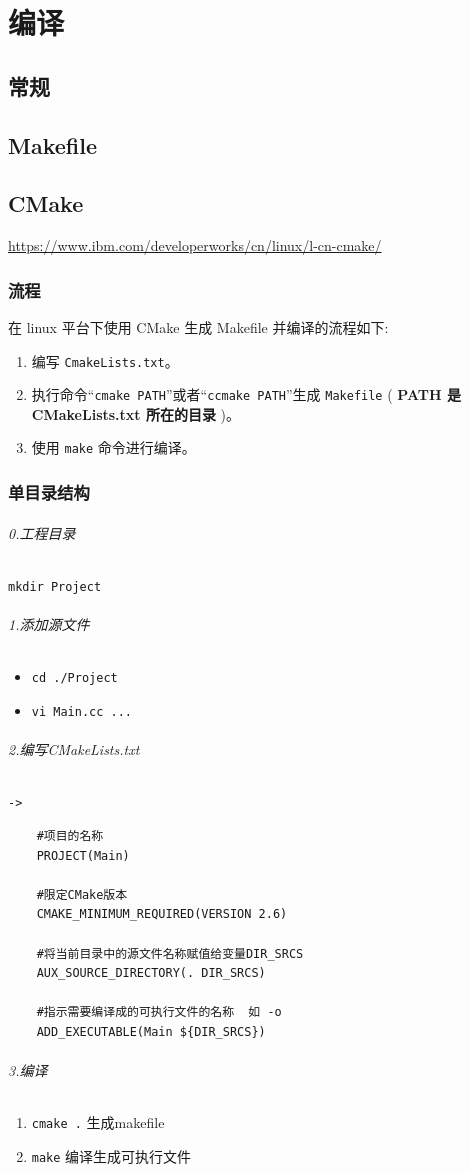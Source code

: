 \documentclass[UTF8,a4paper,12pt]{ctexbook}
\begin{document}
\chapter{编译}
	\section{常规}
	
	\section{Makefile}
	
	
	\section{CMake}	
		\url{https://www.ibm.com/developerworks/cn/linux/l-cn-cmake/}
		\subsection{流程}
			在 linux 平台下使用 CMake 生成 Makefile 并编译的流程如下:
			
			\begin{enumerate}
				\item 编写 \verb|CmakeLists.txt|。
				\item 执行命令“\verb|cmake PATH|”或者“\verb|ccmake PATH|”生成 \verb|Makefile| ( \textbf{PATH 是 CMakeLists.txt 所在的目录} )。
				\item 使用 \verb|make| 命令进行编译。
			\end{enumerate}
			
		\subsection{单目录结构}
			\subparagraph{0.工程目录}
				\verb|mkdir Project|
			\subparagraph{1.添加源文件}
				\begin{itemize}[itemindent = 2em]
					\item \verb|cd ./Project|
					\item \verb|vi Main.cc ...|
				\end{itemize}
				
			\subparagraph{2.编写CMakeLists.txt}\verb|-> |
				\begin{lstlisting}
	#项目的名称
	PROJECT(Main)
	
	#限定CMake版本
	CMAKE_MINIMUM_REQUIRED(VERSION 2.6)
	
	#将当前目录中的源文件名称赋值给变量DIR_SRCS
	AUX_SOURCE_DIRECTORY(. DIR_SRCS)
	
	#指示需要编译成的可执行文件的名称  如 -o
	ADD_EXECUTABLE(Main ${DIR_SRCS})
				\end{lstlisting}
			\subparagraph{3.编译}
				\begin{enumerate}[itemindent = 2em]
					\item \verb|cmake .| 生成makefile
					\item \verb|make| 编译生成可执行文件
				\end{enumerate}
				
\end{document}
